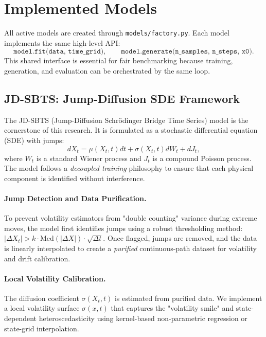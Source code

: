 \documentclass[11pt,a4paper]{article}
\begin{document}
\section{Implemented Models}

All active models are created through \texttt{models/factory.py}. Each model
implements the same high-level API:
\begin{equation}
    \texttt{model.fit(data, time\_grid)}, \qquad
    \texttt{model.generate(n\_samples, n\_steps, x0)}.
\end{equation}
This shared interface is essential for fair benchmarking because training,
generation, and evaluation can be orchestrated by the same loop.

\subsection{JD-SBTS: Jump-Diffusion SDE Framework}

The JD-SBTS (Jump-Diffusion Schrödinger Bridge Time Series) model is the
cornerstone of this research. It is formulated as a stochastic differential
equation (SDE) with jumps:
\begin{equation}
    dX_t = \mu(X_t, t)dt + \sigma(X_t, t)dW_t + dJ_t,
\end{equation}
where $W_t$ is a standard Wiener process and $J_t$ is a compound Poisson process.
The model follows a \textit{decoupled training} philosophy to ensure that each
physical component is identified without interference.

\paragraph{Jump Detection and Data Purification.}
To prevent volatility estimators from "double counting" variance during extreme
moves, the model first identifies jumps using a robust thresholding method:
$|\Delta X_t| > k \cdot \text{Med}(|\Delta X|) \cdot \sqrt{\Delta t}$. Once
flagged, jumps are removed, and the data is linearly interpolated to create a
\textit{purified} continuous-path dataset for volatility and drift calibration.

\paragraph{Local Volatility Calibration.}
The diffusion coefficient $\sigma(X_t, t)$ is estimated from purified data. We
implement a local volatility surface $\sigma(x,t)$ that captures the "volatility
smile" and state-dependent heteroscedasticity using kernel-based non-parametric
regression or state-grid interpolation.
\end{document}

